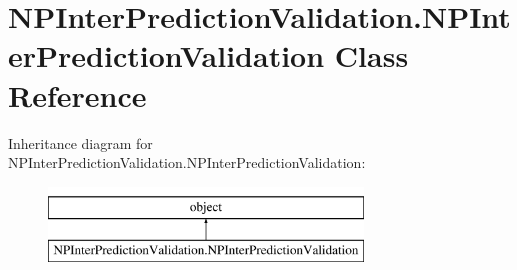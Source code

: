 \hypertarget{classNPInterPredictionValidation_1_1NPInterPredictionValidation}{\section{N\-P\-Inter\-Prediction\-Validation.\-N\-P\-Inter\-Prediction\-Validation Class Reference}
\label{classNPInterPredictionValidation_1_1NPInterPredictionValidation}
}
Inheritance diagram for N\-P\-Inter\-Prediction\-Validation.\-N\-P\-Inter\-Prediction\-Validation\-:\begin{figure}[H]
\begin{center}
\leavevmode
\includegraphics[height=2.000000cm]{classNPInterPredictionValidation_1_1NPInterPredictionValidation}
\end{center}
\end{figure}

